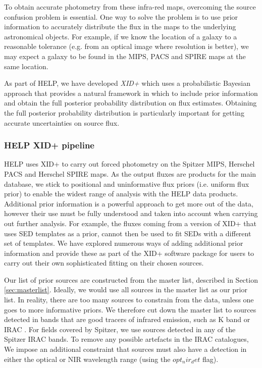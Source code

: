 \documentclass[usenatbib]{mnras}
\begin{document}
To obtain accurate photometry from these infra-red maps, overcoming the source confusion problem is essential. One way to solve the problem is to use prior information to accurately distribute the flux in the maps to the underlying astronomical objects. For example, if we know the location of a galaxy to a reasonable tolerance (e.g. from an optical image where resolution is better), we may expect a galaxy to be found in the MIPS, PACS and SPIRE maps at the same location.

As part of HELP, we have developed \emph{XID+} \citep{Hurley:2017} which uses a probabilistic Bayesian approach that provides a natural framework in which to include prior information and obtain the full posterior probability distribution on flux estimates. Obtaining the full posterior probability distribution is particularly important for getting accurate uncertainties on source flux.

\subsubsection[HELP XID+ pipeline \\ {\color{red}Discusses how this was applied for different bands and prior lists}  ]{HELP XID+ pipeline}
HELP uses XID+ to carry out forced photometry on the Spitzer MIPS, Herschel PACS and Herschel SPIRE maps. As the output fluxes are products for the main database, we stick to positional and uninformative flux priors (i.e. uniform flux prior) to enable the widest range of analysis with the HELP data products. Additional prior information is a powerful approach to get more out of the data, however their use must be fully understood and taken into account when carrying out further analysis. For example, the fluxes coming from a version of XID+ that uses SED templates as a prior, cannot then be used to fit SEDs with a different set of templates. We have explored numerous ways of adding additional prior information and provide these as part of the XID+ software package for users to carry out their own sophisticated fitting on their chosen sources. 

Our list of prior sources are constructed from the master list, described in Section \ref{sec:masterlist}. Ideally, we would use all sources in the master list as our prior list. In reality, there are too many sources to constrain from the data, unless one goes to more informative priors. We therefore cut down the master list to sources detected in bands that are good tracers of infrared emission, such as K band or IRAC \citep{Duivenvorden:2018}. For fields covered by Spitzer, we use sources detected in any of the Spitzer IRAC bands. To remove any possible artefacts in the IRAC catalogues, We impose an additional constraint that sources must also have a detection in either the optical or NIR wavelength range (using the $opt_nir_det$ flag). 
\end{document}

